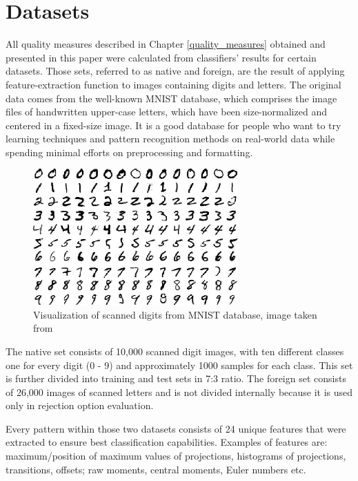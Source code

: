\chapter{Datasets} \label{datasets}

All quality measures described in Chapter \ref{quality_measures} obtained and presented in this paper were calculated from classifiers' results for certain datasets. Those sets, referred to as native and foreign, are the result of applying feature-extraction function to images containing digits and letters. The original data comes from the well-known MNIST database\cite{MNIST}, which comprises the image files of handwritten upper-case letters, which have been size-normalized and centered in a fixed-size image. It is a good database for people who want to try learning techniques and pattern recognition methods on real-world data while spending minimal efforts on preprocessing and formatting.

\begin{figure}[htp]
	\centering
	\includegraphics[width=0.7\textwidth]{Figures/mnistdigits.jpg}
	\caption{Visualization of scanned digits from MNIST database, image taken from \cite{Kuan_Hoong_Blog}}
	\label{fig:mnist_digits}\vspace{-3pt}
\end{figure}

The native set consists of 10,000 scanned digit images, with ten different classes one for every digit (0 - 9) and approximately 1000 samples for each class. This set is further divided into training and test sets in 7:3 ratio. The foreign set consists of 26,000 images of scanned letters and is not divided internally because it is used only in rejection option evaluation.

Every pattern within those two datasets consists of 24 unique features that were extracted to ensure best classification capabilities. Examples of features are: maximum/position of maximum values of projections, histograms of projections, transitions, offsets; raw moments, central moments, Euler numbers etc. 